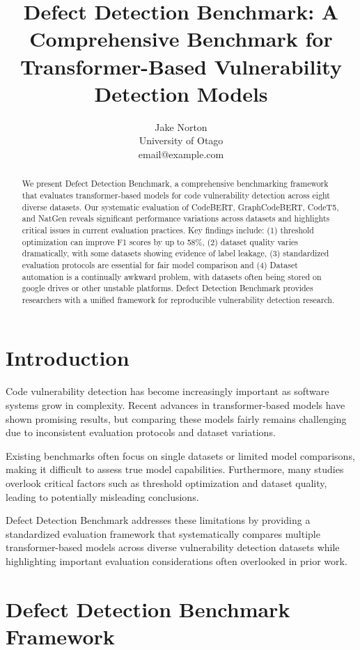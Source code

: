 \documentclass[letterpaper]{article}
\title{Defect Detection Benchmark: A Comprehensive Benchmark for Transformer-Based Vulnerability Detection Models}
\author{
Jake Norton\\
University of Otago\\
email@example.com
}
\begin{document}
\maketitle

\begin{abstract}
	We present Defect Detection Benchmark, a comprehensive benchmarking framework that evaluates transformer-based models for code vulnerability detection across eight diverse datasets. Our systematic
	evaluation of CodeBERT, GraphCodeBERT, CodeT5, and NatGen reveals significant performance variations across datasets and highlights critical issues in current evaluation practices. Key findings
	include: (1) threshold optimization can improve F1 scores by up to 58\%, (2) dataset quality varies dramatically, with some datasets showing evidence of label leakage, (3) standardized evaluation
	protocols are essential for fair model comparison and (4) Dataset automation is a continually awkward problem, with datasets often being stored on google drives or other unstable platforms. Defect
	Detection Benchmark provides researchers with a unified framework for reproducible vulnerability detection research.
\end{abstract}

\section{Introduction}

Code vulnerability detection has become increasingly important as software systems grow in complexity. Recent advances in transformer-based models have shown promising results, but comparing these models fairly remains challenging due to inconsistent evaluation protocols and dataset variations.

Existing benchmarks often focus on single datasets or limited model comparisons, making it difficult to assess true model capabilities. Furthermore, many studies overlook critical factors such as threshold optimization and dataset quality, leading to potentially misleading conclusions.

Defect Detection Benchmark addresses these limitations by providing a standardized evaluation framework that systematically compares multiple transformer-based models across diverse vulnerability detection datasets while highlighting important evaluation considerations often overlooked in prior work.

\section{Defect Detection Benchmark Framework}
\end{document}
